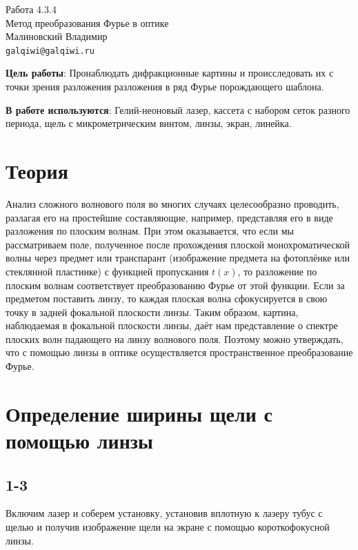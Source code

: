 
\usepackage{booktabs}
\usepackage{multirow}

\usepackage{wrapfig}



\begin{center}
  \LARGE{Работа 4.3.4}\\[0.2cm]
  \LARGE{Метод преобразования Фурье в оптике}\\[0.2cm]
  \large{Малиновский Владимир}\\[0.2cm]
  \normalsize{\texttt{galqiwi@galqiwi.ru}}
\end{center}

\textbf{Цель работы}: Пронаблюдать дифракционные картины и происследовать их с точки зрения разложения разложения в ряд Фурье порождающего шаблона.

\textbf{В работе используются}: Гелий-неоновый лазер, кассета с набором сеток разного периода, щель с микрометрическим винтом, линзы, экран, линейка.

\section*{Теория}
Анализ сложного волнового поля во многих случаях целесообразно проводить, разлагая его на простейшие составляющие, например, представляя его в виде разложения по плоским волнам. При этом оказывается, что если мы рассматриваем поле, полученное после прохождения плоской монохроматической волны через предмет или транспарант (изображение предмета на фотоплёнке или стеклянной пластинке) с функцией пропускания $t(x)$, то разложение по плоским волнам соответствует преобразованию Фурье от этой функции. Если за предметом поставить линзу, то каждая плоская волна сфокусируется в свою точку в задней фокальной плоскости линзы. Таким образом, картина, наблюдаемая в фокальной плоскости линзы, даёт нам представление о спектре плоских волн падающего на линзу волнового поля. Поэтому можно утверждать, что с помощью линзы в оптике осуществляется пространственное преобразование Фурье.

\section*{Определение ширины щели с помощью линзы}
\subsection*{1-3}
Включим лазер и соберем установку, установив вплотную к лазеру тубус с щелью и получив изображение щели на экране с помощью короткофокусной линзы.

